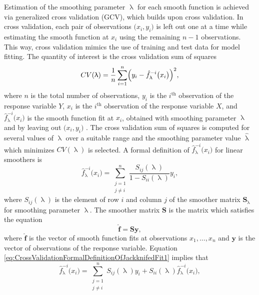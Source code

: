 Estimation of the smoothing parameter \(\uplambda\) for each smooth function is achieved via generalized cross validation (GCV), which builds upon cross validation.  In cross validation, each pair of observations \(\bigl(x_i, y_i\bigr)\) is left out one at a time while estimating the smooth function at \(x_i\) using the remaining \(n - 1\) observations.  This way, cross validation mimics the use of training and test data for model fitting.  The quantity of interest is the cross validation sum of squares
\begin{equation}
  \label{eq:CrossValidationSumOfSquares01}
  CV(\uplambda) = \frac{1}{n} \sum_{i = 1}^n\Bigl(y_i - \hat{f}_\uplambda^{-i}\bigl(x_i\bigr)\Bigr)^2,
\end{equation}
where \(n\) is the total number of observations, \(y_i\) is the \(i^{\text{th}}\) observation of the response variable \(Y\), \(x_i\) is the \(i^{\text{th}}\) observation of the response variable \(X\), and \(\hat{f}_\uplambda^{-i}\bigl(x_i\bigr)\) is the smooth function fit at \(x_i\), obtained with smoothing parameter \(\uplambda\) and by leaving out \(\bigl(x_i, y_i\bigr)\) \parencite{Hastie1991}.  The cross validation sum of squares is computed for several values of \(\uplambda\) over a suitable range and the smoothing parameter value \(\hat{\uplambda}\) which minimizes \(CV(\uplambda)\) is selected.  A formal definition of \(\hat{f}_\uplambda^{-i}\bigl(x_i\bigr)\) for linear smoothers is
\begin{equation}
  \label{eq:CrossValidationFormalDefinitionOfJackknifedFit1}
  \hat{f}_\uplambda^{-i}\bigl(x_i\bigr) = \sum_{\substack{j = 1 \\ j \not = i}}^n \frac{S_{i j}(\uplambda)}{1 - S_{i i}(\uplambda)} y_i,
\end{equation}
where \(S_{i j}(\uplambda)\) is the element of row \(i\) and column \(j\) of the smoother matrix \(\symbf{S}_\uplambda\) for smoothing parameter \(\uplambda\).  The smoother matrix \(\symbf{S}\) is the matrix which satisfies the equation
\begin{equation}
  \label{eq:SmootherMatrixDefinition}
  \hat{\symbf{f}} = \symbf{S} \symbf{y},
\end{equation}
where \(\hat{\symbf{f}}\) is the vector of smooth function fits at observations \(x_1, \ldots, x_n\) and \(\symbf{y}\) is the vector of observations of the response variable.
Equation \ref{eq:CrossValidationFormalDefinitionOfJackknifedFit1} implies that
\begin{equation}
  \label{eq:CrossValidationFormalDefinitionOfJackknifedFit2}
  \hat{f}_\uplambda^{-i}\bigl(x_i\bigr) = \sum_{\substack{j = 1 \\ j \not = i}}^n S_{i j}(\uplambda) y_i +S_{i i}(\uplambda) \hat{f}_\uplambda^{-i}\bigl(x_i\bigr),
\end{equation}
